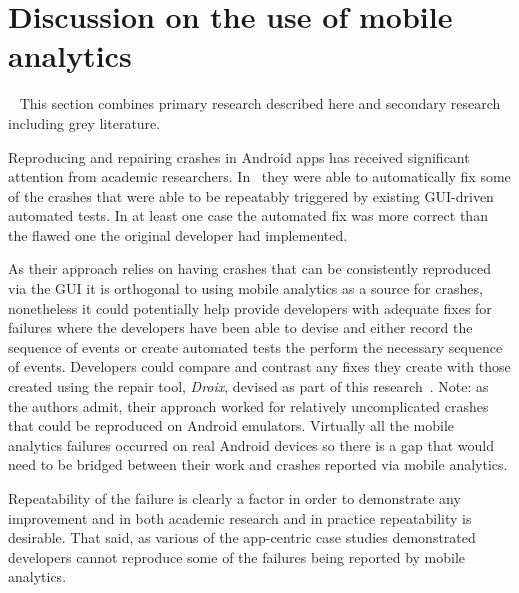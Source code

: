 \section{Discussion on the use of mobile analytics}~\label{aiu-discussion-section}
This section combines primary research described here and secondary research including grey literature.

 Reproducing and repairing crashes in Android apps has received significant attention from academic researchers. In~\citet{tan2018_repairing_crashes_in_android_apps} they were able to automatically fix some of the crashes that were able to be repeatably triggered by existing GUI-driven automated tests. In at least one case the automated fix was more correct than the flawed one the original developer had implemented. 

As their approach relies on having crashes that can be consistently reproduced via the GUI it is orthogonal to using mobile analytics as a source for crashes, nonetheless it could potentially help provide developers with adequate fixes for failures where the developers have been able to devise and either record the sequence of events or create automated tests the perform the necessary sequence of events. Developers could compare and contrast any fixes they create with those created using the repair tool, \textit{Droix}, devised as part of this research~\citep{tan2018_repairing_crashes_in_android_apps}. Note: as the authors admit, their approach worked for relatively uncomplicated crashes that could be reproduced on Android emulators. Virtually all the mobile analytics failures occurred on real Android devices so there is a gap that would need to be bridged between their work and crashes reported via mobile analytics.  

Repeatability of the failure is clearly a factor in order to demonstrate any improvement and in both academic research and in practice repeatability is desirable. That said, as various of the app-centric case studies demonstrated developers cannot reproduce some of the failures being reported by mobile analytics. 

